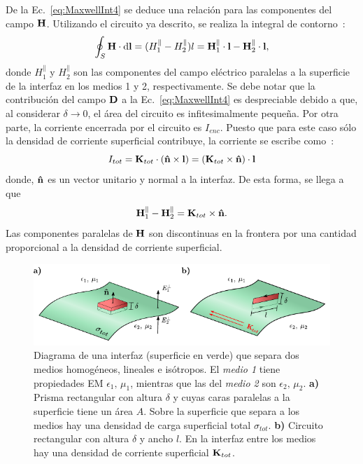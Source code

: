 De la Ec.~\eqref{eq:MaxwellInt4} se deduce una relación para las componentes del campo $\vb{H}$. Utilizando el circuito ya descrito, se realiza la integral de contorno~\cite{griffiths2013electrodynamics}:
\begin{equation}
\oint_{S}\vb{H}\cdot\dd{\vb{l}}=(H^{\parallel}_{1}-H^{\parallel}_{2})l=\vb{H}^{\parallel}_{1}\cdot\vb{l}-\vb{H}^{\parallel}_{2}\cdot\vb{l},
\end{equation}
donde $H_{1}^{\parallel}$ y $H_{2}^{\parallel}$ son las componentes del campo eléctrico paralelas a la superficie de la interfaz en los medios 1 y 2, respectivamente. Se debe notar que la contribución del campo $\vb{D}$ a la Ec.~\eqref{eq:MaxwellInt4} es despreciable debido a que, al considerar $\delta\to0$, el área del circuito es infitesimalmente pequeña. Por otra parte, la corriente encerrada por el circuito es
$I_{enc}$. Puesto que para este caso sólo la densidad de corriente superficial contribuye, la corriente se escribe como~\cite{griffiths2013electrodynamics}: 
\begin{equation}
I_{tot}=\vb{K}_{tot}\cdot\left(\vu{n}\times\vb{l}\right)=\left(\vb{K}_{tot}\times\vu{n}\right)\cdot \vb{l} 
\end{equation}
donde, $\vu{n}$ es un vector unitario y normal a la interfaz. De esta forma, se llega a que~\cite{griffiths2013electrodynamics}
\begin{equation}
\vb{H}_{1}^{\parallel}-\vb{H}^{\parallel}_{2}=\vb{K}_{tot}\times\vu{n}.
\end{equation}
Las componentes paralelas de $\vb{H}$ son discontinuas en la frontera por una cantidad proporcional a la densidad de corriente superficial.
\begin{figure}[ht!]
	\centering
	\includegraphics[width=12.5cm]{1-Capitulo-Repaso/0-Diagramas/dibujo.pdf}
	\caption[Condiciones de frontera]{Diagrama de una interfaz (superficie en verde) que separa dos medios homogéneos, lineales e isótropos. El \textit{medio 1} tiene propiedades EM $\epsilon_{1},\,\mu_{1}$, mientras que las del \textit{medio 2} son $\epsilon_{2},\,\mu_{2}$. \textbf{a)} Prisma rectangular con altura $\delta$ y cuyas caras paralelas a la superficie tiene un área $A$. Sobre la superficie que separa a los medios hay una densidad de carga superficial total $\sigma_{tot}$. \textbf{b)} Circuito rectangular con altura $\delta$ y ancho $l$. En la interfaz entre los medios hay una densidad de corriente superficial $\vb{K}_{tot}$.}
	\label{fig:BoundaryConditions} 
\end{figure}
% 


